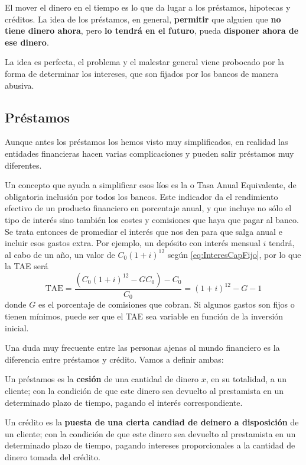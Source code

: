\documentclass[nochap,palatino,shortheader]{apuntes}
\begin{document}
El mover el dinero en el tiempo es lo que da lugar a los préstamos, hipotecas y créditos. La idea de los préstamos, en general, \textbf{permitir} que alguien que \textbf{no tiene dinero ahora}, pero \textbf{lo tendrá en el futuro}, pueda \textbf{disponer ahora de ese dinero}.

La idea es perfecta, el problema y el malestar general viene probocado por la forma de determinar los intereses, que son fijados por los bancos de manera abusiva.


\subsection{Préstamos}

Aunque antes los préstamos los hemos visto muy simplificados, en realidad las entidades financieras hacen varias complicaciones y pueden salir préstamos muy diferentes.

Un concepto que ayuda a simplificar esos líos es la  o Tasa Anual Equivalente, de obligatoria inclusión por todos los bancos. Este indicador da el rendimiento efectivo de un producto financiero en porcentaje anual, y que incluye no sólo el tipo de interés sino también los costes y comisiones que haya que pagar al banco. Se trata entonces de promediar el interés que nos den para que salga anual e incluir esos gastos extra. Por ejemplo, un depósito con interés mensual $i$ tendrá, al cabo de un año, un valor de $C_0(1+i)^{12}$ según \eqref{eq:InteresCapFijo}, por lo que la TAE será \[ \mathrm{TAE} = \frac{(C_0(1+i)^{12} - GC_0) - C_0}{C_0} = (1+i)^{12} - G - 1 \] donde $G$ es el porcentaje de comisiones que cobran. Si algunos gastos son fijos o tienen mínimos, puede ser que el TAE sea variable en función de la inversión inicial.

Una duda muy frecuente entre las personas ajenas al mundo financiero es la diferencia entre préstamos y crédito. Vamos a definir ambas:

\begin{defn}[Préstamos]
Un préstamos es la \textbf{cesión} de una cantidad de dinero $x$, en su totalidad, a un cliente; con la condición de que este dinero sea devuelto al prestamista en un determinado plazo de tiempo, pagando el interés correspondiente.
\end{defn}

\begin{defn}[Crédito]
Un crédito es la \textbf{puesta de una cierta candiad de deinero a disposición} de un cliente; con la condición de que este dinero sea devuelto al prestamista en un determinado plazo de tiempo, pagando intereses proporcionales a la cantidad de dinero tomada del crédito.
\end{defn}
\end{document}
